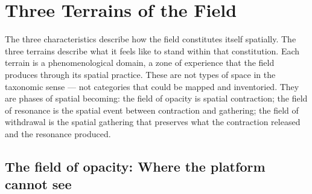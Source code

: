 \section{Three Terrains of the Field}

The three characteristics describe how the field constitutes itself spatially. The three terrains describe what it feels like to stand within that constitution. Each terrain is a phenomenological domain, a zone of experience that the field produces through its spatial practice. These are not types of space in the taxonomic sense — not categories that could be mapped and inventoried. They are phases of spatial becoming: the field of opacity is spatial contraction; the field of resonance is the spatial event between contraction and gathering; the field of withdrawal is the spatial gathering that preserves what the contraction released and the resonance produced.

\subsection{The field of opacity: Where the platform cannot see}

